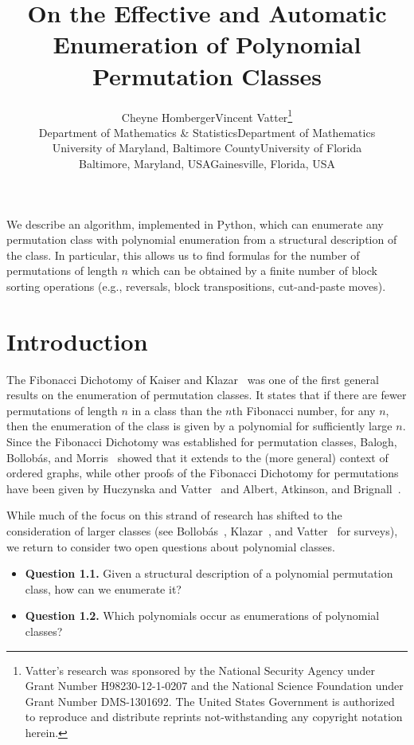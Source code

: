 \documentclass[10pt]{article}
\title{\sc On the Effective and Automatic Enumeration of Polynomial Permutation Classes}
\author{%
	\begin{tabular}{cc}
        Cheyne Homberger&Vincent Vatter\footnote{Vatter's research was sponsored by the National Security Agency under Grant Number H98230-12-1-0207 and the National Science Foundation under Grant Number DMS-1301692.  The United States Government is authorized to reproduce and distribute reprints not-withstanding any copyright notation herein.}\\
		{\small Department of Mathematics \& Statistics}&{\small Department of Mathematics}\\[-3pt]
		{\small University of Maryland, Baltimore County}&{\small University of Florida}\\[-3pt]
		{\small Baltimore, Maryland, USA}&{\small Gainesville, Florida, USA}\\[-10pt]
	\end{tabular}
}
\date{}
\theoremstyle{plain}
\theoremstyle{definition}
\renewenvironment{abstract}%
                {
                  \begin{list}{}%
                     {\setlength{\rightmargin}{1in}%
                      \setlength{\leftmargin}{1in}}%
                   \item[]\ignorespaces\begin{small}}%
                 {\end{small}\unskip\end{list}}
\begin{document}
\maketitle

\pagestyle{main}

\begin{abstract}
We describe an algorithm, implemented in Python, which can enumerate any permutation class with polynomial enumeration from a structural description of the class. In particular, this allows us to find formulas for the number of permutations of length $n$ which can be obtained by a finite number of block sorting operations (e.g., reversals, block transpositions, cut-and-paste moves).
\end{abstract}

\section{Introduction}\label{sec-poly-intro}

The Fibonacci Dichotomy of Kaiser and Klazar~\cite{kaiser:on-growth-rates:} was one of the first general results on the enumeration of permutation classes. It states that if there are fewer permutations of length $n$ in a class than the $n$th Fibonacci number, for any $n$, then the enumeration of the class is given by a polynomial for sufficiently large $n$. Since the Fibonacci Dichotomy was established for permutation classes, Balogh, Bollob\'as, and Morris~\cite{balogh:hereditary-prop:ordgraphs} showed that it extends to the (more general) context of ordered graphs, while other proofs of the Fibonacci Dichotomy for permutations have been given by Huczynska and Vatter~\cite{huczynska:grid-classes-an:} and Albert, Atkinson, and Brignall~\cite{albert:permutation-cla:}.

While much of the focus on this strand of research has shifted to the consideration of larger classes (see Bollob\'as~\cite{bollobas:hereditary-and-}, Klazar~\cite{klazar:overview-of-som}, and Vatter~\cite{vatter:permutation-cla:} for surveys), we return to consider two open questions about polynomial classes. 

\begin{itemize}
\item {\bf Question 1.1.} Given a structural description of a polynomial permutation class, how can we enumerate it?
\addtocounter{theorem}{1}
\item {\bf Question 1.2.} Which polynomials occur as enumerations of polynomial classes?
\addtocounter{theorem}{1}
\end{itemize}
\end{document}
